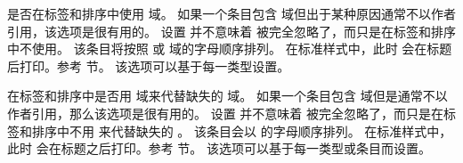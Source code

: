 \begin{optionlist}



是否在标签和排序中使用  域。
如果一个条目包含  域但出于某种原因通常不以作者引用，该选项是很有用的。
设置  并不意味着  被完全忽略了，而只是在标签和排序中不使用。
该条目将按照  或  域的字母顺序排列。
在标准样式中，此时  会在标题后打印。参考  节。
该选项可以基于每一类型设置。



在标签和排序中是否用  域来代替缺失的  域。
如果一个条目包含  域但是通常不以作者引用，那么该选项是很有用的。
设置  并不意味着  被完全忽略了，而只是在标签和排序中不用  来代替缺失的 。
该条目会以  的字母顺序排列。
在标准样式中，此时  会在标题之后打印。参考  节。
该选项可以基于每一类型或条目而设置。



\end{optionlist}
